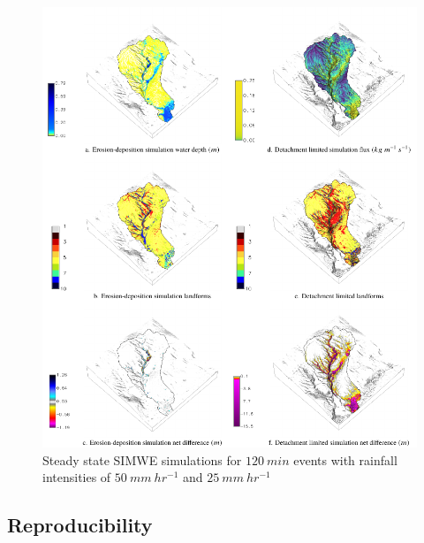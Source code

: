 \documentclass[esurf, manuscript]{copernicus}
\begin{document}
\begin{figure}%
\center
\includegraphics[width=\textwidth,height=0.95\textheight,keepaspectratio]{figures/simwe.pdf}
\caption{Steady state SIMWE simulations
for $120~min$ events with rainfall intensities of $50~mm~hr^{-1}$
and $25~mm~hr^{-1}$}
\label{fig:simwe_simulations}
\end{figure}



\subsection{Reproducibility}


\end{document}
